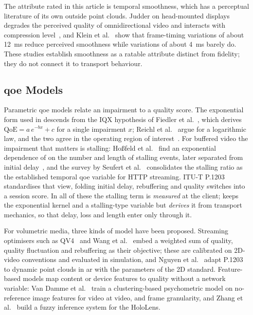 The attribute rated in this article is temporal smoothness, which has
a perceptual literature of its own outside point clouds. Judder on
head-mounted displays degrades the perceived quality of
omnidirectional video and interacts with compression
level~\cite{mahmoudpour2019judder}, and Klein et
al.~\cite{klein2024vft} show that frame-timing variations of about
\SI{12}{\milli\second} reduce perceived smoothness while variations of
about \SI{4}{\milli\second} barely do. These studies establish
smoothness as a ratable attribute distinct from fidelity; they do not
connect it to transport behaviour.

\subsection{\gls{qoe} Models}
\label{sec:rw-models}

Parametric \gls{qoe} models relate an impairment to a quality score.
The exponential form used in \crystal descends from the IQX hypothesis
of Fiedler et al.~\cite{fiedler2010}, which derives
$\mathrm{QoE} = a\,e^{-bx} + c$ for a single impairment $x$; Reichl et
al.~\cite{reichl2010} argue for a logarithmic law, and the two agree in
the operating region of interest~\cite{alreshoodi2013}. For buffered
video the impairment that matters is stalling: Ho{\ss}feld et
al.~\cite{hossfeld2011youtube} find an exponential dependence of \mos
on the number and length of stalling events, later separated from
initial delay~\cite{hossfeld2012initial}, and the survey by Seufert et
al.~\cite{seufert2015survey} consolidates the stalling ratio as the
established temporal \gls{qoe} variable for HTTP streaming. ITU-T
P.1203~\cite{itu_p1203} standardises that view, folding initial delay,
rebuffering and quality switches into a session score. In all of these
the stalling term is \emph{measured} at the client; \crystal keeps the
exponential kernel and a stalling-type variable but \emph{derives} it
from transport mechanics, so that delay, loss and \gof length enter
only through it.

For volumetric media, three kinds of model have been proposed.
Streaming optimisers such as QV4~\cite{qv424} and Wang et
al.~\cite{wang2022tmm} embed a weighted sum of quality, quality
fluctuation and rebuffering as their objective; these are calibrated
on 2D-video conventions and evaluated in simulation, and Nguyen et
al.~\cite{qoedynamicpc} adapt P.1203 to dynamic point clouds in
\gls{ar} with the parameters of the 2D standard. Feature-based models
map content or device features to quality without a network variable:
Van Damme et al.~\cite{vandamme2022,vandamme2024} train a
clustering-based psychometric model on no-reference image features for
\vpcc video at video, \gof and frame granularity, and Zhang et
al.~\cite{zhang2019towards} build a fuzzy inference system for the
HoloLens.

